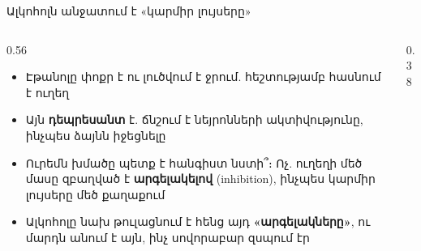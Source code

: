 \begin{frame}{Ալկոհոլն անջատում է «կարմիր լույսերը»}
  \begin{columns}[c]
    \begin{column}{0.56\textwidth}
      \begin{itemize}
        \item Էթանոլը փոքր է ու լուծվում է ջրում. հեշտությամբ հասնում է ուղեղ
        \item Այն \textbf{դեպրեսանտ} է. ճնշում է նեյրոնների ակտիվությունը, ինչպես ձայնն իջեցնելը 
        \item<2-> Ուրեմն խմածը պետք է հանգիստ նստի՞։ Ոչ. ուղեղի մեծ մասը զբաղված է \textbf{արգելակելով} (inhibition), ինչպես կարմիր լույսերը մեծ քաղաքում 
        \item<4-> Ալկոհոլը նախ թուլացնում է հենց այդ \textbf{«արգելակները»}, ու մարդն անում է այն, ինչ սովորաբար զսպում էր
      \end{itemize}
    \end{column}
    \begin{column}{0.38\textwidth}
    \end{column}
  \end{columns}
\end{frame}


